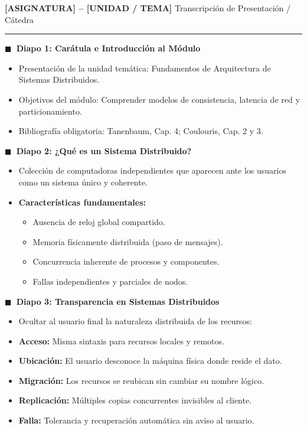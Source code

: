 \documentclass[9pt,a4paper,twocolumn]{extarticle}
\newcommand{\filmina}[2]{%
  \par\vspace{3.5pt}%
  \noindent\textbf{\sffamily\fontsize{8.5pt}{10.5pt}\selectfont $\blacksquare$\ Diapo #1: #2}%
  \par\vspace{1.5pt}%
}
\begin{document}
\noindent
{\fontsize{11pt}{13pt}\selectfont\sffamily\bfseries [ASIGNATURA] -- [UNIDAD / TEMA]}\hfill
{\fontsize{7.5pt}{9.5pt}\selectfont\sffamily\color{black!75} Transcripción de Presentación / Cátedra}\\[1pt]
\rule{\linewidth}{0.6pt}\vspace{1.5mm}


\filmina{1}{Carátula e Introducción al Módulo}
\begin{itemize}
    \item Presentación de la unidad temática: Fundamentos de Arquitectura de Sistemas Distribuidos.
    \item Objetivos del módulo: Comprender modelos de consistencia, latencia de red y particionamiento.
    \item Bibliografía obligatoria: Tanenbaum, Cap. 4; Coulouris, Cap. 2 y 3.
\end{itemize}

\filmina{2}{¿Qué es un Sistema Distribuido?}
\begin{itemize}
    \item Colección de computadoras independientes que aparecen ante los usuarios como un sistema único y coherente.
    \item \textbf{Características fundamentales:}
    \begin{itemize}
        \item Ausencia de reloj global compartido.
        \item Memoria físicamente distribuida (paso de mensajes).
        \item Concurrencia inherente de procesos y componentes.
        \item Fallas independientes y parciales de nodos.
    \end{itemize}
\end{itemize}

\filmina{3}{Transparencia en Sistemas Distribuidos}
\begin{itemize}
    \item Ocultar al usuario final la naturaleza distribuida de los recursos:
    \item \textbf{Acceso:} Misma sintaxis para recursos locales y remotos.
    \item \textbf{Ubicación:} El usuario desconoce la máquina física donde reside el dato.
    \item \textbf{Migración:} Los recursos se reubican sin cambiar su nombre lógico.
    \item \textbf{Replicación:} Múltiples copias concurrentes invisibles al cliente.
    \item \textbf{Falla:} Tolerancia y recuperación automática sin aviso al usuario.
\end{itemize}
\end{document}
